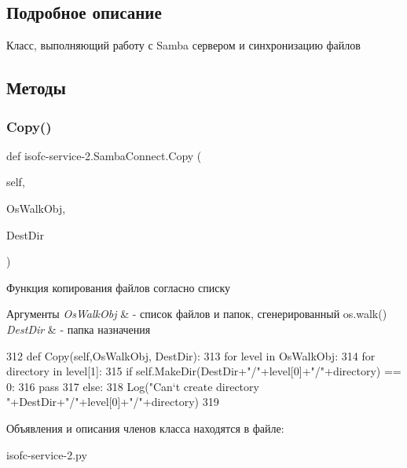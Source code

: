 \subsection{Подробное описание}
Класс, выполняющий работу с Samba сервером и синхронизацию файлов 

\subsection{Методы}
\mbox{\label{classisofc-service-2_1_1SambaConnect_a9f1fb626dc2e0d69254ffa2e79df8149}} 
\subsubsection{\texorpdfstring{Copy()}{Copy()}}
{\footnotesize\ttfamily def isofc-\/service-\/2.Samba\+Connect.\+Copy (\begin{DoxyParamCaption}\item[{}]{self,  }\item[{}]{Os\+Walk\+Obj,  }\item[{}]{Dest\+Dir }\end{DoxyParamCaption})}



Функция копирования файлов согласно списку 


\begin{DoxyParams}{Аргументы}
{\em Os\+Walk\+Obj} & -\/ список файлов и папок, сгенерированный os.\+walk() \\
\hline
{\em Dest\+Dir} & -\/ папка назначения \\
\hline
\end{DoxyParams}

\begin{DoxyCode}
312     \textcolor{keyword}{def }Copy(self,OsWalkObj, DestDir):
313         \textcolor{keywordflow}{for} level \textcolor{keywordflow}{in} OsWalkObj:
314             \textcolor{keywordflow}{for} directory \textcolor{keywordflow}{in} level[1]:
315                 \textcolor{keywordflow}{if} self.MakeDir(DestDir+\textcolor{stringliteral}{"/"}+level[0]+\textcolor{stringliteral}{"/"}+directory) == 0:
316                     \textcolor{keywordflow}{pass}
317                 \textcolor{keywordflow}{else}:
318                     Log(\textcolor{stringliteral}{"Can`t create directory "}+DestDir+\textcolor{stringliteral}{"/"}+level[0]+\textcolor{stringliteral}{"/"}+directory)
319 
\end{DoxyCode}


Объявления и описания членов класса находятся в файле\+:\begin{DoxyCompactItemize}
\item 
isofc-\/service-\/2.\+py\end{DoxyCompactItemize}
